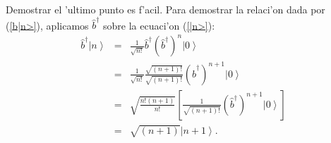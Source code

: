 Demostrar el 'ultimo punto es f'acil. Para demostrar la relaci'on
dada por (\ref{b|n>}), aplicamos $\hat{b}^{\dagger}$ sobre la ecuaci'on (\ref{|n>}):%
\begin{eqnarray}
\hat{b}^{\dagger}\left| n\right> & = &\frac{1}{\sqrt{n!}}\hat
{b}^{\dagger}\left( \hat{b}^{\dagger}\right) ^{n}\left| 0\right>
\\
& = &\frac{1}{\sqrt{n!}}\frac{\sqrt{\left( n+1\right) !}}{\sqrt{\left(
n+1\right) !}}\left( \hat{b}^{\dagger}\right) ^{n+1}\left|
0\right> \\
& = &\sqrt{\frac{n!\left( n+1\right) }{n!}}\left[ \frac{1}{\sqrt{\left(
n+1\right) !}}\left( \hat{b}^{\dagger}\right) ^{n+1}\left|
0\right> \right] \\
& = &\sqrt{\left( n+1\right) }\left| n+1\right> .
\end{eqnarray}

